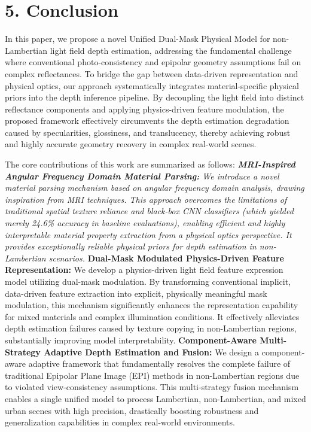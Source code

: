 \section{5. Conclusion}


In this paper, we propose a novel Unified Dual-Mask Physical Model for non-Lambertian light field depth estimation, addressing the fundamental challenge where conventional photo-consistency and epipolar geometry assumptions fail on complex reflectances. To bridge the gap between data-driven representation and physical optics, our approach systematically integrates material-specific physical priors into the depth inference pipeline. By decoupling the light field into distinct reflectance components and applying physics-driven feature modulation, the proposed framework effectively circumvents the depth estimation degradation caused by specularities, glossiness, and translucency, thereby achieving robust and highly accurate geometry recovery in complex real-world scenes.

The core contributions of this work are summarized as follows:
\textit{ \textbf{MRI-Inspired Angular Frequency Domain Material Parsing:} We introduce a novel material parsing mechanism based on angular frequency domain analysis, drawing inspiration from MRI techniques. This approach overcomes the limitations of traditional spatial texture reliance and black-box CNN classifiers (which yielded merely 24.6\% accuracy in baseline evaluations), enabling efficient and highly interpretable material property extraction from a physical optics perspective. It provides exceptionally reliable physical priors for depth estimation in non-Lambertian scenarios.
} \textbf{Dual-Mask Modulated Physics-Driven Feature Representation:} We develop a physics-driven light field feature expression model utilizing dual-mask modulation. By transforming conventional implicit, data-driven feature extraction into explicit, physically meaningful mask modulation, this mechanism significantly enhances the representation capability for mixed materials and complex illumination conditions. It effectively alleviates depth estimation failures caused by texture copying in non-Lambertian regions, substantially improving model interpretability.
\textbf{Component-Aware Multi-Strategy Adaptive Depth Estimation and Fusion:} We design a component-aware adaptive framework that fundamentally resolves the complete failure of traditional Epipolar Plane Image (EPI) methods in non-Lambertian regions due to violated view-consistency assumptions. This multi-strategy fusion mechanism enables a single unified model to process Lambertian, non-Lambertian, and mixed urban scenes with high precision, drastically boosting robustness and generalization capabilities in complex real-world environments.

